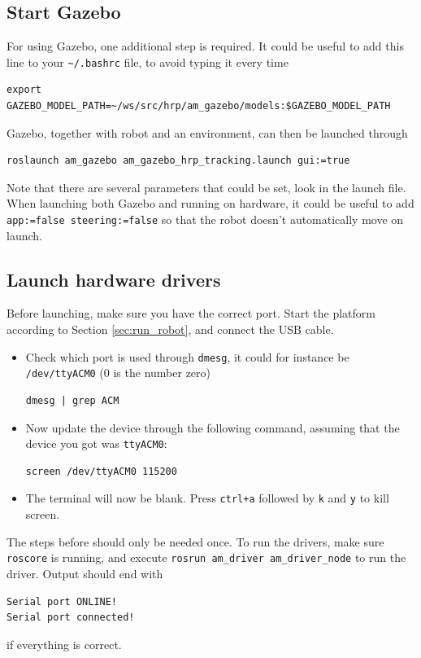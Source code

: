\documentclass[]{article}
\begin{document}
\subsection{Start Gazebo}\label{sec:run_gazebo}
For using Gazebo, one additional step is required. It could be useful to add this line to your \verb|~/.bashrc| file, to avoid typing it every time
\begin{verbatim}
export GAZEBO_MODEL_PATH=~/ws/src/hrp/am_gazebo/models:$GAZEBO_MODEL_PATH
\end{verbatim}

Gazebo, together with robot and an environment, can then be launched through
\begin{verbatim}
roslaunch am_gazebo am_gazebo_hrp_tracking.launch gui:=true
\end{verbatim}
Note that there are several parameters that could be set, look in the launch file. When launching both Gazebo and running on hardware, it could be useful to add \verb|app:=false steering:=false| so that the robot doesn't automatically move on launch.

\subsection{Launch hardware drivers}
Before launching, make sure you have the correct port. Start the platform according to Section \ref{sec:run_robot}, and connect the USB cable.
\begin{itemize}
\item Check which port is used through \verb|dmesg|, it could for instance be \verb|/dev/ttyACM0| (0 is the number zero)
\begin{verbatim}
dmesg | grep ACM
\end{verbatim}

\item Now update the device through the following command, assuming that the device you got was \verb|ttyACM0|:
\begin{verbatim}
screen /dev/ttyACM0 115200
\end{verbatim}

\item The terminal will now be blank. Press \verb|ctrl+a| followed by \verb|k| and \verb|y| to kill screen.
\end{itemize} 

The steps before should only be needed once. To run the drivers, make sure \verb|roscore| is running, and execute \verb|rosrun am_driver am_driver_node| to run the driver. Output should end with
\begin{verbatim}
Serial port ONLINE!
Serial port connected!
\end{verbatim}
if everything is correct.
\end{document}
